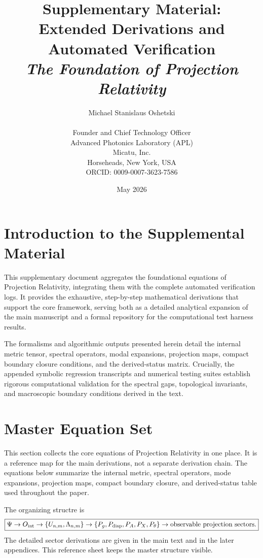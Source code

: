 \documentclass[11pt]{article}
\title{Supplementary Material: \\ 
\Large Extended Derivations and Automated Verification \\ 
\textit{The Foundation of Projection Relativity}}
\author{Michael Stanislaus Oshetski \orcidlink{0009-0007-3623-7586} \\
\small \email{michael.oshetski@micatu.com}\\
\small Founder and Chief Technology Officer \\
\small Advanced Photonics Laboratory (APL)\\
\small Micatu, Inc. \\
\small Horseheads, New York, USA \\
\small ORCID: 0009-0007-3623-7586
\date {May 2026}}
\begin{document}
\maketitle

\section{Introduction to the Supplemental Material}

This supplementary document aggregates the foundational equations of Projection Relativity, integrating them with the complete automated verification logs. It provides the exhaustive, step-by-step mathematical derivations that support the core framework, serving both as a detailed analytical expansion of the main manuscript and a formal repository for the computational test harness results.

The formalisms and algorithmic outputs presented herein detail the internal metric tensor, spectral operators, modal expansions, projection maps, compact boundary closure conditions, and the derived-status matrix. Crucially, the appended symbolic regression transcripts and numerical testing suites establish rigorous computational validation for the spectral gaps, topological invariants, and macroscopic boundary conditions derived in the text.

\renewcommand{\contentsname}{Table of Contents} %
\tableofcontents
\clearpage %


\section{Master Equation Set}
\label{app:how-to-use}

This section collects the core equations of Projection Relativity in one place. It is a reference map for the main derivations, not a separate derivation chain. The equations below summarize the internal metric, spectral operators, mode expansions, projection maps, compact boundary closure, and derived-status table used throughout the paper.

The organizing structre is
\begin{equation}
\boxed{
\Psi
\rightarrow
O_{\rm int}
\rightarrow
\{U_{n,m},\Lambda_{n,m}\}
\rightarrow
\{P_g,P_{\rm disp},P_A,P_X,P_\theta\}
\rightarrow
\text{observable projection sectors}.
}
\end{equation}
The detailed sector derivations are given in the main text and in the later appendices. This reference sheet keeps the master structure visible.
\end{document}
